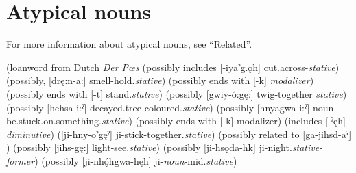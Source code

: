 \section{Atypical nouns} \label{ch:atypical nouns (list)}
For more information about atypical nouns, see “Related”.

\begin{multicols}{2}
  (loanword from Dutch \textit{Der Pœs}
 
 
 
 
 
  (possibly includes [-iyaˀg.ǫh] cut.across-\textit{stative})
  (possibly, [drę:n-a:] smell-hold.\textit{stative})
 
 
  (possibly ends with [-k] \textit{modalizer})
 
  (possibly ends with [-t] stand.\textit{stative})
 
 
 
 
 
 
 
 
 
  (possibly [gwiy-ó:gę:] twig-together \textit{stative})
 
  (possibly [hehsa-i:ˀ] decayed.tree-coloured.\textit{stative})
 
  (possibly [hnyagwa-i:ˀ] noun-be.stuck.\-on.something.\textit{stative})
  (possibly ends with [-k] modalizer)
  (includes [-ˀęh] \textit{diminutive})
  ([ji-hny-oˀgęˀ] ji-stick-together.\textit{stative})
  (possibly related to [ga-jihsd-aˀ] )
  (possibly [jihs-gę:] light-see.\textit{stative})
 
  (possibly [ji-hsǫda-hk] ji-night.\textit{stative-former})
 
  (possibly [ji-nhǫ́hgwa-hęh] ji-\textit{noun}-mid.\textit{stative})

\end{multicols}

